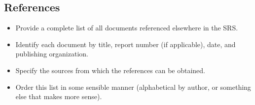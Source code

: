 \documentclass[]{article}
\begin{document}
\subsection{References}
\label{sub:references}
\begin{itemize}
	\item Provide a complete list of all documents referenced elsewhere in the SRS.
	\item Identify each document by title, report number (if applicable), date, and publishing organization.
	\item Specify the sources from which the references can be obtained.
	\item Order this list in some sensible manner (alphabetical by author, or something else that makes more sense).
\end{itemize}
\end{document}
